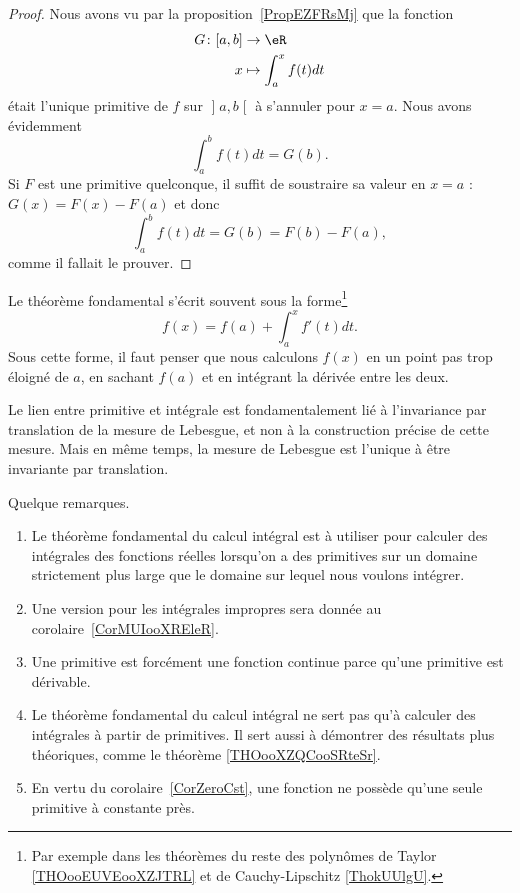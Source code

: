 \begin{proof}
	Nous avons vu par la proposition~\ref{PropEZFRsMj} que la fonction
	\begin{equation}
		\begin{aligned}
			G\colon \mathopen[ a , b \mathclose] & \to \eR                 \\
			x                                    & \mapsto  \int_a^xf(t)dt
		\end{aligned}
	\end{equation}
	était l'unique primitive de \( f\) sur \( \mathopen] a , b \mathclose[\) à s'annuler pour \( x=a\). Nous avons évidemment
	\begin{equation}
		\int_a^bf(t)dt=G(b).
	\end{equation}
	Si \( F\) est une primitive quelconque, il suffit de soustraire sa valeur en \( x=a\) : \( G(x)=F(x)-F(a)\) et donc
	\begin{equation}
		\int_a^bf(t)dt=G(b)=F(b)-F(a),
	\end{equation}
	comme il fallait le prouver.
\end{proof}

Le théorème fondamental s'écrit souvent sous la forme\footnote{Par exemple dans les théorèmes du reste des polynômes de Taylor \ref{THOooEUVEooXZJTRL} et de Cauchy-Lipschitz \ref{ThokUUlgU}.}
\begin{equation}        \label{EqooBBCYooNweVrF}
	f(x)=f(a)+\int_a^xf'(t)dt.
\end{equation}
Sous cette forme, il faut penser que nous calculons \( f(x)\) en un point pas trop éloigné de \( a\), en sachant \( f(a)\) et en intégrant la dérivée entre les deux.

\begin{remark}
	Le lien entre primitive et intégrale est fondamentalement lié à l'invariance par translation de la mesure de Lebesgue, et non à la construction précise de cette mesure. Mais en même temps, la mesure de Lebesgue est l'unique à être invariante par translation.
\end{remark}

Quelque remarques.
\begin{enumerate}
	\item
	      Le théorème fondamental du calcul intégral est à utiliser pour calculer des intégrales des fonctions réelles lorsqu'on a des primitives sur un domaine strictement plus large que le domaine sur lequel nous voulons intégrer.
	\item
	      Une version pour les intégrales impropres sera donnée au corolaire~\ref{CorMUIooXREleR}.
	\item
	      Une primitive est forcément une fonction continue parce qu'une primitive est dérivable.
	\item
	      Le théorème fondamental du calcul intégral ne sert pas qu'à calculer des intégrales à partir de primitives. Il sert aussi à démontrer des résultats plus théoriques, comme le théorème \ref{THOooXZQCooSRteSr}.
	\item
	      En vertu du corolaire~\ref{CorZeroCst}, une fonction ne possède qu'une seule primitive à constante près.
\end{enumerate}


